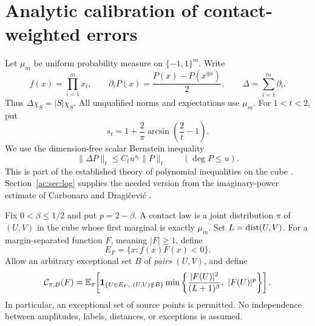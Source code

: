 \providecommand{\norm}[2]{\lVert #1\rVert_{#2}}
\section{Analytic calibration of contact-weighted errors}
Let $\mu_m$ be uniform probability measure on $\{-1,1\}^m$. Write
\[
 f(x)=\prod_{i=1}^m x_i,\qquad
 \partial_i P(x)=\frac{P(x)-P(x^{\oplus i})}{2},\qquad
 \Delta=\sum_{i=1}^m\partial_i.
\]
Thus $\Delta\chi_S=|S|\chi_S$. All unqualified norms and expectations use $\mu_m$. For $1<t<2$, put
\[
 s_t=1+\frac{2}{\pi}\arcsin\!\left(\frac2t-1\right).
\]
We use the dimension-free scalar Bernstein inequality
\begin{equation}\label{ac:eq:bernstein}
 \norm{\Delta P}{t}\le C_t u^{s_t}\norm{P}{t}
 \qquad (\deg P\le u).
\end{equation}
This is part of the established theory of polynomial inequalities on the cube \cite{EI}. Section~\ref{ac:sec:log} supplies the needed version from the imaginary-power estimate of Carbonaro and Dragi\v cevi\'c \cite{CD}.

Fix $0<\beta\le1/2$ and put $p=2-\beta$. A contact law is a joint distribution $\pi$ of $(U,V)$ in the cube whose first marginal is exactly $\mu_m$. Set $L=\operatorname{dist}(U,V)$. For a margin-separated function $F$, meaning $|F|\ge1$, define
\[
 E_F=\{x:f(x)F(x)<0\}.
\]
Allow an arbitrary exceptional set $B$ of \emph{pairs} $(U,V)$, and define
\begin{equation}\label{ac:eq:cost}
 \mathcal C_{\pi,B}(F)
 =\E_\pi\!\left[\mathbf 1_{\{U\in E_F,\ (U,V)\notin B\}}
 \min\left\{\frac{|F(U)|^2}{(L+1)^\beta},\ |F(U)|^p\right\}\right].
\end{equation}
In particular, an exceptional set of source points is permitted. No independence between amplitudes, labels, distances, or exceptions is assumed.

